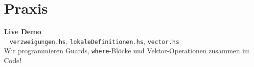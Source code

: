 \documentclass[aspectratio=169,11pt]{beamer}
\begin{document}
\section{Praxis}

\begin{frame}[plain]
    \begin{center}
        \Huge \textbf{Live Demo} \\
        \vspace{0.5cm}
        \large \faLaptopCode~ \texttt{verzweigungen.hs}, \texttt{lokaleDefinitionen.hs}, \texttt{vector.hs} \\
        \vspace{0.3cm}
        \normalsize Wir programmieren Guards, \texttt{where}-Blöcke und Vektor-Operationen zusammen im Code!
    \end{center}
\end{frame}
\end{document}

